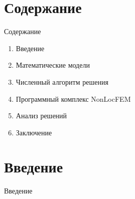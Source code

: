 \begin{frame}
    \setcounter{framenumber}{1}
    \maketitle
\end{frame}

\section{Содержание}

\begin{frame}{Содержание}
	\LARGE
	\begin{enumerate}
		\item Введение
		\item Математические модели
		\item Численный алгоритм решения
		\item Программный комплекс NonLocFEM
		\item Анализ решений
		\item Заключение
	\end{enumerate}
\end{frame}

\section{Введение}
\begin{frame}
	\centering
	\Huge
	Введение
\end{frame}

